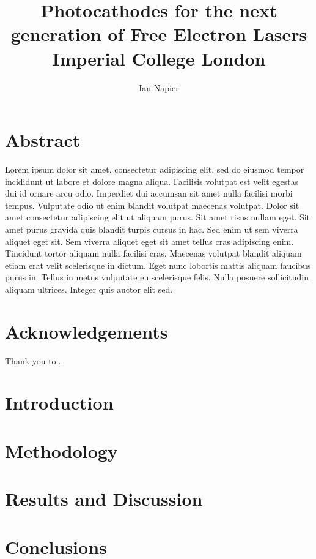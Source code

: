 \documentclass[11pt, a4paper, twoside, openany]{book}
\title{
	{Photocathodes for the next generation of Free Electron Lasers}\\
	{\large Imperial College London}
}
\author{Ian Napier}
\begin{document}
\frontmatter
\maketitle


\chapter*{Abstract}
Lorem ipsum dolor sit amet, consectetur adipiscing elit, sed do eiusmod tempor incididunt ut labore et dolore magna aliqua. Facilisis volutpat est velit egestas dui id ornare arcu odio. Imperdiet dui accumsan sit amet nulla facilisi morbi tempus. Vulputate odio ut enim blandit volutpat maecenas volutpat. Dolor sit amet consectetur adipiscing elit ut aliquam purus. Sit amet risus nullam eget. Sit amet purus gravida quis blandit turpis cursus in hac. Sed enim ut sem viverra aliquet eget sit. Sem viverra aliquet eget sit amet tellus cras adipiscing enim. Tincidunt tortor aliquam nulla facilisi cras. Maecenas volutpat blandit aliquam etiam erat velit scelerisque in dictum. Eget nunc lobortis mattis aliquam faucibus purus in. Tellus in metus vulputate eu scelerisque felis. Nulla posuere sollicitudin aliquam ultrices. Integer quis auctor elit sed.



\chapter*{Acknowledgements}
Thank you to...
\clearpage

\tableofcontents

\mainmatter
\chapter{Introduction}


\chapter{Methodology}


\chapter{Results and Discussion}


\chapter{Conclusions}


\backmatter
\end{document}
